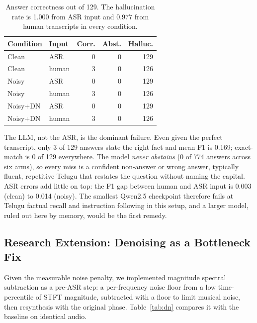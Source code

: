 \documentclass[11pt,a4paper,twocolumn]{article}
\begin{document}
\begin{table}[t]
\centering\footnotesize
\begin{tabular}{@{}llrrr@{}}
\toprule
\textbf{Condition} & \textbf{Input} & \textbf{Corr.} & \textbf{Abst.} & \textbf{Halluc.} \\
\midrule
Clean & ASR & 0 & 0 & 129 \\
Clean & human & 3 & 0 & 126 \\
Noisy & ASR & 0 & 0 & 129 \\
Noisy & human & 3 & 0 & 126 \\
Noisy+DN & ASR & 0 & 0 & 129 \\
Noisy+DN & human & 3 & 0 & 126 \\
\bottomrule
\end{tabular}
\caption{Answer correctness out of 129. The hallucination rate is 1.000 from ASR input and 0.977 from human transcripts in every condition.}
\label{tab:halluc}
\end{table}

The LLM, not the ASR, is the dominant failure. Even given the perfect transcript, only 3 of 129 answers state the right fact and mean F1 is 0.169; exact-match is 0 of 129 everywhere. The model \emph{never abstains} (0 of 774 answers across six arms), so every miss is a confident non-answer or wrong answer, typically fluent, repetitive Telugu that restates the question without naming the capital. ASR errors add little on top: the F1 gap between human and ASR input is 0.003 (clean) to 0.014 (noisy). The smallest Qwen2.5 checkpoint therefore fails at Telugu factual recall and instruction following in this setup, and a larger model, ruled out here by memory, would be the first remedy.

\subsection{Research Extension: Denoising as a Bottleneck Fix}

Given the measurable noise penalty, we implemented magnitude spectral subtraction \citep{boll} as a pre-ASR step: a per-frequency noise floor from a low time-percentile of STFT magnitude, subtracted with a floor to limit musical noise, then resynthesis with the original phase. Table~\ref{tab:dn} compares it with the baseline on identical audio.
\end{document}
